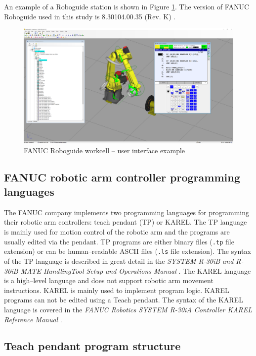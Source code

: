 An example of a Roboguide station is shown in Figure \ref{fig:roboguide}. The version of FANUC Roboguide used in this study is 8.30104.00.35 (Rev. K) \cite{roboguide}. 

\begin{figure}[h]
    \centering
    \includegraphics[width=0.9\linewidth]{img/roboguide.PNG}
    \caption{FANUC Roboguide workcell -- user interface example}
    \label{fig:roboguide}
\end{figure}

\subsection{FANUC robotic arm controller programming languages}

The FANUC company implements two programming languages for programming their robotic arm controllers: teach pendant (TP) or KAREL. The TP language is mainly used for motion control of the robotic arm and the programs are usually edited via the pendant. TP programs are either binary files (\texttt{.tp} file extension) or can be human--readable ASCII files (\texttt{.ls} file extension). The syntax of the TP language is described in great detail in the \emph{SYSTEM R-30iB and R-30iB MATE HandlingTool Setup and Operations Manual} \cite{fanuchandling}. The KAREL language is a high--level language and does not support robotic arm movement instructions. KAREL is mainly used to implement program logic. KAREL programs can not be edited using a Teach pendant. The syntax of the KAREL language is covered in the \emph{FANUC Robotics SYSTEM R-30iA Controller KAREL Reference Manual} \cite{karelmanual}.



\subsection{Teach pendant program structure}

